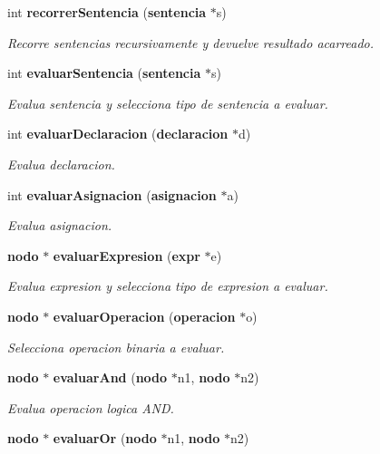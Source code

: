\begin{CompactItemize}
int {\bf recorrer\-Sentencia} ({\bf sentencia} $\ast$s)
\begin{CompactList}\small\item\em Recorre sentencias recursivamente y devuelve resultado acarreado. \item\end{CompactList}\item 
int {\bf evaluar\-Sentencia} ({\bf sentencia} $\ast$s)
\begin{CompactList}\small\item\em Evalua sentencia y selecciona tipo de sentencia a evaluar. \item\end{CompactList}\item 
int {\bf evaluar\-Declaracion} ({\bf declaracion} $\ast$d)
\begin{CompactList}\small\item\em Evalua declaracion. \item\end{CompactList}\item 
int {\bf evaluar\-Asignacion} ({\bf asignacion} $\ast$a)
\begin{CompactList}\small\item\em Evalua asignacion. \item\end{CompactList}\item 
{\bf nodo} $\ast$ {\bf evaluar\-Expresion} ({\bf expr} $\ast$e)
\begin{CompactList}\small\item\em Evalua expresion y selecciona tipo de expresion a evaluar. \item\end{CompactList}\item 
{\bf nodo} $\ast$ {\bf evaluar\-Operacion} ({\bf operacion} $\ast$o)
\begin{CompactList}\small\item\em Selecciona operacion binaria a evaluar. \item\end{CompactList}\item 
{\bf nodo} $\ast$ {\bf evaluar\-And} ({\bf nodo} $\ast$n1, {\bf nodo} $\ast$n2)
\begin{CompactList}\small\item\em Evalua operacion logica AND. \item\end{CompactList}\item 
{\bf nodo} $\ast$ {\bf evaluar\-Or} ({\bf nodo} $\ast$n1, {\bf nodo} $\ast$n2)

\end{CompactItemize}
